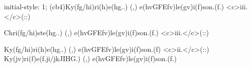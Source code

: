 initial-style: 1;
(cb4)Ky(fg/hi)ri(h)e(hg..) (,) e(hvGFEfv)le(gv)i(f)son.(f.) <c>iii.</c>(::)

Chri(fg/hi)ste(hg..) (,) e(hvGFEfv)le(gv)i(f)son.(f.) <c>iii.</c>(::)

Ky(fg/hi)ri(h)e(hg..) (,) e(hvGFEfv)le(gv)i(f)son.(f) <c>ii.</c>(::)
Ky(jv)ri(f)e(f.ji/jkJIHG.) (,) e(hvGFEfv)le(gv)i(f)son.(f.)
